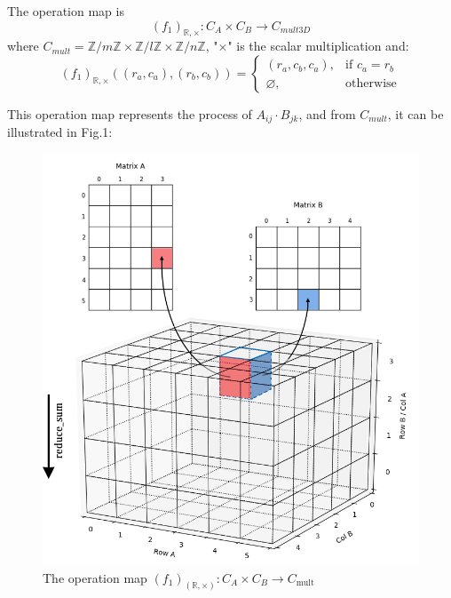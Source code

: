 \documentclass{amsart}
\theoremstyle{definition}
\theoremstyle{remark}
\numberwithin{equation}{section}
\begin{document}
The operation map is
\begin{equation}
(f_1)_{\mathbb{R},\times}:C_A\times C_B\to C_{mult3D}
\end{equation}
where $C_{mult}=\mathbb{Z}/{m\mathbb{Z}}\times \mathbb{Z}/{l\mathbb{Z}}\times \mathbb{Z}/{n\mathbb{Z}}$, "$\times$" is the scalar multiplication and:
\begin{equation}
(f_1)_{\mathbb{R},\times}((r_a,c_a),(r_b,c_b))=
\left\{
\begin{array}{ll}  
             (r_a,c_b,c_a), &\text{if } c_a=r_b  \\ 
             \varnothing, &\text{otherwise}
\end{array}
\right.
\end{equation}
\par
	This operation map represents the process of $A_{ij}\cdot B_{jk}$, and from $C_{mult}$, it can be illustrated in Fig.1:
\begin{figure}[h]
	\includegraphics[scale=0.45]{Figures/Matrix3d.png}
	\caption{The operation map $(f_1)_(\mathbb{R},\times ):C_A\times C_B\to C_{\text{mult}}$}
	\label{Fig:1}
\end{figure}
~\\
~\\
\end{document}
